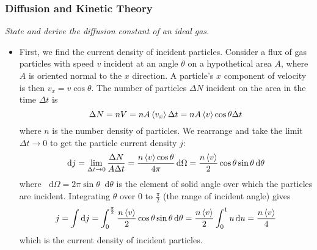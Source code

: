 \documentclass[11pt, a4paper]{article}
\newcommand{\diff}{\mathop{}\!\mathrm{d}} %
\begin{document}
\subsubsection{Diffusion and Kinetic Theory}
\textit{State and derive the diffusion constant of an ideal gas.}
\begin{itemize}
	\item First, we find the current density of incident particles. Consider a flux of gas particles with speed $ v $ incident at an angle $ \theta $ on a hypothetical area $ A $, where $ A $ is oriented normal to the $ x $ direction. A particle's $ x $ component of velocity is then $ v_{x} = v \cos \theta $. The number of particles $ \Delta N $ incident on the area in the time $ \Delta t $ is
	\begin{equation*}
		\Delta N = nV = n A \expval{v_{x}} \Delta t =  n A \expval{v} \cos \theta \Delta t
	\end{equation*}
	where $ n $ is the number density of particles. We rearrange and take the limit $ \Delta t \to 0 $ to get the particle current density $ j $:
	\begin{equation*}
		\diff j = \lim_{\Delta t \to 0} \frac{\Delta N}{A \Delta t} = \frac{n \expval{v} \cos \theta}{4\pi} \diff \Omega = \frac{n\expval{v}}{2} \cos \theta \sin \theta \diff \theta
	\end{equation*}
	where $ \diff \Omega  = 2\pi \sin \theta \diff \theta$ is the element of solid angle over which the particles are incident. Integrating $ \theta $ over $ 0 $ to $ \frac{\pi}{2} $ (the range of incident angle) gives
	\begin{equation*}
		j = \int \diff j = \int_{0}^{\frac{\pi}{2}} \frac{n\expval{v}}{2} \cos \theta \sin \theta \diff \theta = \frac{n\expval{v}}{2} \int_{0}^{1} u \diff u = \frac{n\expval{v}}{4}
	\end{equation*}
	which is the current density of incident particles.
	

\end{itemize}
\end{document}
